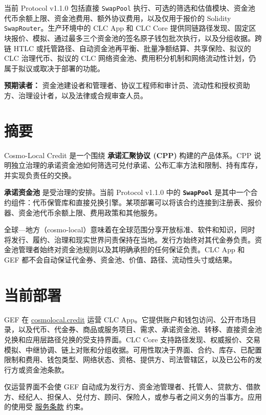 \documentclass[11pt]{article}
\begin{document}
当前 Protocol v1.1.0 包括直接 \texttt{SwapPool} 执行、可选的筛选和估值模块、资金池代币余额上限、资金池费用、额外协议费用，以及仅用于报价的 Solidity \texttt{SwapRouter}。生产环境中的 CLC App 和 CLC Core 提供同链路径发现、固定区块报价、模拟、通过最多三个资金池的签名原子钱包批次执行，以及分组收据。跨链 HTLC 或托管路径、自动资金池再平衡、批量净额结算、共享保险、拟议的 CLC 治理代币、拟议的 CLC 网络资金池、费用积分机制和网络流动性计划，仍属于拟议或取决于部署的功能。

\textbf{预期读者：} 资金池建设者和管理者、协议工程师和审计员、流动性和授权资助方、治理设计者，以及法律或合规审查人员。

\section*{摘要}

Cosmo-Local Credit 是一个围绕 \textbf{承诺汇聚协议 (CPP)} 构建的产品体系。CPP 说明独立治理的承诺资金池如何筛选可兑付承诺、公布汇率方法和限制、持有库存，并实现负责任的交换。

\textbf{承诺资金池} 是受治理的安排。当前 Protocol v1.1.0 中的 \textbf{\texttt{SwapPool}} 是其中一个合约组件：代币保管库和直接兑换引擎。某项部署可以将该合约连接到注册表、报价器、资金池代币余额上限、费用政策和其他服务。

全球---地方（cosmo-local）意味着在全球范围分享开放标准、软件和知识，同时将发行、履约、治理和现实世界问责保持在当地。发行方始终对其代金券负责。资金池管理者始终对资金池规则以及其明确承担的任何保证负责。CLC App 和 GEF 都不会自动保证代金券、资金池、价值、路径、流动性头寸或结果。

\section*{当前部署}

GEF 在 \href{https://cosmolocal.credit}{cosmolocal.credit} 运营 CLC App。它提供账户和钱包访问、公开市场目录，以及代币、代金券、商品或服务项目、需求、承诺资金池、转移、直接资金池兑换和应用层路径兑换的受支持界面。CLC Core 支持路径发现、权威报价、交易模拟、中继协调、链上对账和分组收据。可用性取决于界面、合约、库存、已配置限制和费用、钱包类型、网络状态、资格、提供方、司法管辖区，以及已公布的发行方或资金池条款。

仅运营界面不会使 GEF 自动成为发行方、资金池管理者、托管人、贷款方、借款方、经纪人、担保人、兑付方、顾问、保险人，或参与者之间义务的当事方。应用的使用受 \href{https://docs.cosmolocal.credit/zh/governance/terms}{服务条款} 约束。
\end{document}
